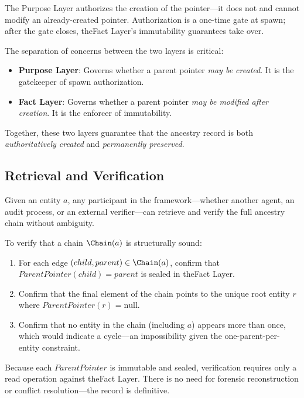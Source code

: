 \begin{note}
The Purpose Layer authorizes the creation of the pointer—it does not and cannot modify an already-created pointer. Authorization is a one-time gate at spawn; after the gate closes, theFact Layer's immutability guarantees take over.
\end{note}

The separation of concerns between the two layers is critical:

\begin{itemize}
    \item \textbf{Purpose Layer}: Governs whether a parent pointer \textit{may be created}. It is the gatekeeper of spawn authorization.
    \item \textbf{Fact Layer}: Governs whether a parent pointer \textit{may be modified after creation}. It is the enforcer of immutability.
\end{itemize}

Together, these two layers guarantee that the ancestry record is both \textit{authoritatively created} and \textit{permanently preserved}.

\subsection{Retrieval and Verification}

Given an entity $a$, any participant in the framework—whether another agent, an audit process, or an external verifier—can retrieve and verify the full ancestry chain without ambiguity.

\begin{verification}
To verify that a chain $\Chain(a)$ is structurally sound:
\begin{enumerate}
    \item For each edge $(child, parent) \in \Chain(a)$, confirm that $ParentPointer(child) = parent$ is sealed in theFact Layer.
    \item Confirm that the final element of the chain points to the unique root entity $r$ where $ParentPointer(r) = \text{null}$.
    \item Confirm that no entity in the chain (including $a$) appears more than once, which would indicate a cycle—an impossibility given the one-parent-per-entity constraint.
\end{enumerate}
Because each $ParentPointer$ is immutable and sealed, verification requires only a read operation against theFact Layer. There is no need for forensic reconstruction or conflict resolution—the record is definitive.
\end{verification}

